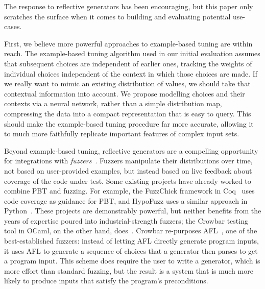 %
The response to reflective generators has been encouraging, but
this paper only scratches the surface when it comes to building and
evaluating potential use-cases.

First, we believe more powerful approaches to example-based tuning are
within reach.  The
example-based tuning algorithm used in
our initial evaluation assumes
that subsequent choices are
independent of earlier ones, tracking the weights of individual
choices independent of the
context in which those choices are made. If we really want to mimic an existing
distribution of values, we should take that contextual information into
account. We propose modelling choices and their contexts via a neural
network,
rather than a simple distribution map, compressing the data into a compact
representation that is easy to query.
This should make the example-based tuning
procedure far more accurate, allowing it to much more faithfully replicate
important features of complex input sets.

Beyond example-based tuning, reflective generators are a compelling opportunity
for integrations with {\em
fuzzers}~\cite{miller_1990,Barrett-Wilt_2021,zalewski_american_2022}. Fuzzers
manipulate their distributions over time, not based on user-provided examples,
but instead based on live feedback about coverage of the
code under test.
Some existing projects have already worked to
combine PBT and fuzzing.
For example, the FuzzChick framework in Coq~\cite{DBLP:journals/pacmpl/Lampropoulos0P19}
uses code coverage as guidance for PBT, and HypoFuzz uses a
similar approach in Python~\cite{hatfield-dodds_hypofuzz_nodate}. These projects
are demonstrably powerful, but neither benefits from the years of expertise
poured into industrial-strength fuzzers; the Crowbar testing tool in
OCaml, on the other hand,
does~\cite{dolan2017testing}. Crowbar re-purposes
AFL~\cite{afl-readme}, one of the best-established
fuzzers: instead of letting AFL directly generate program inputs, it
uses AFL
to generate a sequence of choices that a generator then parses to get a program input.
This scheme
does require the user to write a generator, which is more effort
than standard fuzzing, but the result is a system that is much more likely
to produce inputs that satisfy the program's preconditions.

